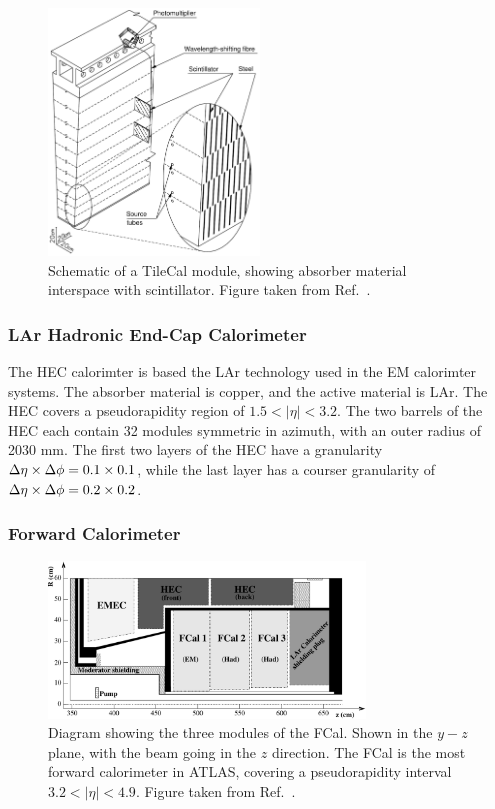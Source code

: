 \begin{figure}
	\centering
	\includegraphics[width=0.5\textwidth]{figures/tile_1.pdf} %
	\caption{ Schematic of a TileCal module, showing absorber material interspace with scintillator. Figure taken from Ref.~\cite{Aad:2008zzm}.}	
	\label{fig:tilecalmodule}
\end{figure}

\subsubsection{LAr Hadronic End-Cap Calorimeter}
The HEC calorimter is based the LAr technology used in the EM calorimter systems. The absorber material is copper, and the active material is LAr. The HEC covers a pseudorapidity region of $1.5<|\eta|<3.2$. The two barrels of the HEC each contain 32 modules symmetric in azimuth, with an outer radius of 2030 mm. The first two layers of the HEC have a granularity $\mbox{$\Delta \eta$}\times\mbox{$\Delta \phi$}=0.1\times0.1$, while the last layer has a courser granularity of $\mbox{$\Delta \eta$}\times\mbox{$\Delta \phi$}=0.2\times0.2$.

\subsubsection{Forward Calorimeter}

\begin{figure}
	\centering
	\includegraphics[width=0.75\textwidth]{figures/fcal_1.pdf} %
	\caption{ Diagram showing the three modules of the FCal. Shown in the $y-z$ plane, with the beam going in the $z$ direction. The FCal is the most forward calorimeter in ATLAS, covering a pseudorapidity interval $3.2<|\eta|<4.9$. Figure taken from Ref.~\cite{Aad:2008zzm}.}	
	\label{fig:fcalmodules}
\end{figure}

